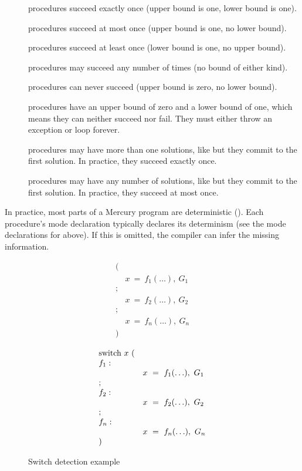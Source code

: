 \begin{description}
    \item[\ddet] procedures succeed exactly once
    (upper bound is one, lower bound is one).
    \item[\dsemidet] procedures succeed at most once
    (upper bound is one, no lower bound).
    \item[\dmulti] procedures succeed at least once
    (lower bound is one, no upper bound).
    \item[\dnondet] procedures may succeed any number of times
    (no bound of either kind).
    \item[\dfailure] procedures can never succeed
    (upper bound is zero, no lower bound).
    \item[\derroneous] procedures have an upper bound of zero and a lower
    bound of one, which means they can neither succeed nor fail.
    They must either throw an exception or loop forever.
    \item[\dccmulti] procedures may have more than one solutions, like \dmulti
    but they commit to the first solution.
    In practice, they succeed exactly once.
    \item[\dccnondet] procedures may have any number of solutions, like
    \dnondet
    but they commit to the first solution.
    In practice, they succeed at most once.
\end{description}

\noindent
In practice, most parts of a Mercury program are deterministic (\ddet).
Each procedure's mode declaration
typically declares its determinism (see the mode declarations for
 above).
If this is omitted, the compiler can infer the missing information.


\begin{figure}
\parbox{0.5\textwidth}{
$$
\begin{array}{ll}
(\\
& x~=~f_1(\ldots),~G_1 \\
; \\
& x~=~f_2(\ldots),~G_2 \\
; \\
& x~=~f_n(\ldots),~G_n \\
)
\end{array}
$$}%
\parbox{0.5\textwidth}{
$$
\begin{array}{ll}
\hbox{switch}~x~( \\
f_1: \\
& x~=~f_1(\ldots),~G_1 \\
; \\
f_2: \\
& x~=~f_2(\ldots),~G_2 \\
; \\
f_n: \\
& x~=~f_n(\ldots),~G_n \\
)
\end{array}
$$}
\caption{Switch detection example}
\label{fig:switch_detect}
\end{figure}

